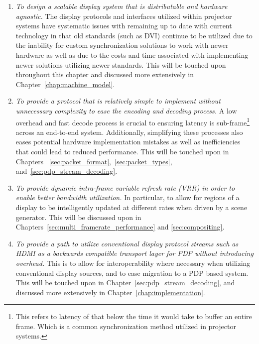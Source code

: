     \begin{enumerate}
        \item {\em To design a scalable display system that is distributable and hardware agnostic.} The display protocols and interfaces utilized within projector systems have systematic issues with remaining up to date with current technology in that old standards (such as DVI) continue to be utilized due to the inability for custom synchronization solutions to work with newer hardware as well as due to the costs and time associated with implementing newer solutions utilizing newer standards. This will be touched upon throughout this chapter and discussed more extensively in Chapter~\ref{chap:machine_model}.
        \item {\em To provide a protocol that is relatively simple to implement without unnecessary complexity to ease the encoding and decoding process.} A low overhead and fast decode process is crucial to ensuring latency is sub-frame\footnote{This refers to latency of that below the time it would take to buffer an entire frame. Which is a common synchronization method utilized in projector systems.} across an end-to-end system. Additionally, simplifying these processes also eases potential hardware implementation mistakes as well as inefficiencies that could lead to reduced performance. This will be touched upon in Chapters~ \ref{sec:packet_format},~\ref{sec:packet_types}, and~\ref{sec:pdp_stream_decoding}.
        \item {\em To provide dynamic intra-frame variable refresh rate (VRR) in order to enable better bandwidth utilization.} In particular, to allow for regions of a display to be intelligently updated at different rates when driven by a scene generator. This will be discussed upon in Chapters~\ref{sec:multi_framerate_performance} and \ref{sec:compositing}.
        \item {\em To provide a path to utilize conventional display protocol streams such as HDMI as a backwards compatible transport layer for PDP without introducing overhead.} This is to allow for interoperability where necessary when utilizing conventional display sources, and to ease migration to a PDP based system. This will be touched upon in Chapter~\ref{sec:pdp_stream_decoding}, and discussed more extensively in Chapter~\ref{chap:implementation}.
    \end{enumerate}

